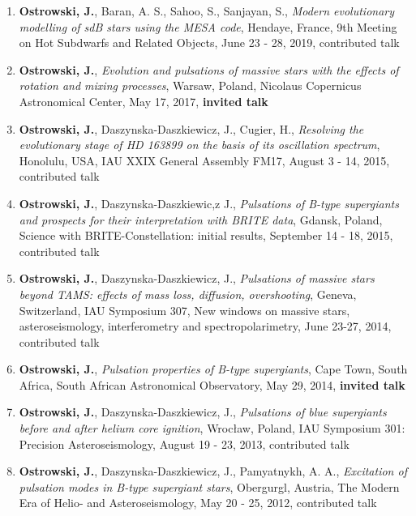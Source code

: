 \documentclass[margin, 10pt]{res} %
\begin{document}
\begin{resume}
\begin{enumerate}
    \item \textbf{Ostrowski, J.}, Baran, A. S., Sahoo, S., Sanjayan, S., \textit{Modern evolutionary modelling of sdB stars using the MESA code}, Hendaye, France, 9th Meeting on Hot Subdwarfs and Related Objects, June 23 - 28, 2019, contributed talk

    \item \textbf{Ostrowski, J.}, \textit{Evolution and pulsations of massive stars with the effects of rotation and mixing processes}, Warsaw, Poland, Nicolaus Copernicus Astronomical Center, May 17, 2017, \textbf{invited talk}

    \item \textbf{Ostrowski, J.}, Daszynska-Daszkiewicz, J., Cugier, H., \textit{Resolving the evolutionary stage of HD 163899 on the basis of its oscillation spectrum}, Honolulu, USA, IAU XXIX General Assembly FM17, August 3 - 14, 2015, contributed talk

    \item \textbf{Ostrowski, J.}, Daszynska-Daszkiewic,z J., \textit{Pulsations of B-type supergiants and prospects for their interpretation with BRITE data}, Gdansk, Poland,  Science with BRITE-Constellation: initial results, September 14 - 18, 2015, contributed talk

    \item \textbf{Ostrowski, J.}, Daszynska-Daszkiewicz, J., \textit{Pulsations of massive stars beyond TAMS: effects of mass loss, diffusion, overshooting}, Geneva, Switzerland, IAU Symposium 307, New windows on massive stars, asteroseismology, interferometry and spectropolarimetry, June 23-27, 2014, contributed talk

    \item \textbf{Ostrowski, J.}, \textit{Pulsation properties of B-type supergiants}, Cape Town, South Africa, South African Astronomical Observatory, May 29, 2014, \textbf{invited talk}

    \item \textbf{Ostrowski, J.}, Daszynska-Daszkiewicz, J., \textit{Pulsations of blue supergiants before and after helium core ignition}, Wroc\l{}aw, Poland, IAU Symposium 301: Precision Asteroseismology, August 19 - 23, 2013, contributed talk

    \item \textbf{Ostrowski, J.}, Daszynska-Daszkiewicz, J., Pamyatnykh, A. A., \textit{Excitation of pulsation modes in B-type supergiant stars}, Obergurgl, Austria, The Modern Era of Helio- and Asteroseismology, May 20 - 25, 2012, contributed talk
\end{enumerate}


\end{resume}
\end{document}
